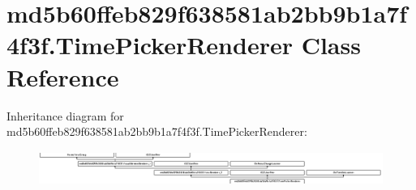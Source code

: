 \hypertarget{classmd5b60ffeb829f638581ab2bb9b1a7f4f3f_1_1TimePickerRenderer}{}\section{md5b60ffeb829f638581ab2bb9b1a7f4f3f.\+Time\+Picker\+Renderer Class Reference}
\label{classmd5b60ffeb829f638581ab2bb9b1a7f4f3f_1_1TimePickerRenderer}
Inheritance diagram for md5b60ffeb829f638581ab2bb9b1a7f4f3f.\+Time\+Picker\+Renderer\+:\begin{figure}[H]
\begin{center}
\leavevmode
\includegraphics[height=1.122807cm]{classmd5b60ffeb829f638581ab2bb9b1a7f4f3f_1_1TimePickerRenderer}
\end{center}
\end{figure}

